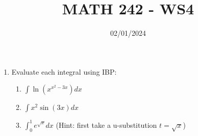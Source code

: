 \documentclass[12pt]{article}
\title{MATH 242 - WS4}
\date{02/01/2024}
\begin{document}
\maketitle


\begin{enumerate}

\item Evaluate each integral using IBP:
\begin{enumerate}
    \item $\int\ln(x^{x^2-3x})dx$
    \vfill
    \item $\int x^2\sin(3x)dx$
    \vfill
    \newpage
    \item $\int_0^1 e^{\sqrt{x}}dx$ (Hint: first take a u-substitution $t=\sqrt{x}$)
\end{enumerate}

\end{enumerate}
\end{document}
